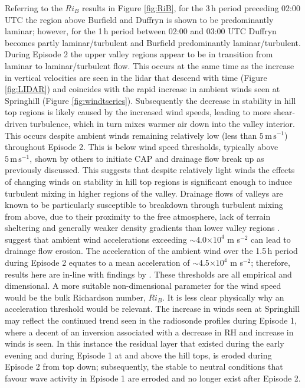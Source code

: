 \documentclass[times]{qjrms4}
\begin{document}
Referring to the $Ri_{B}$ results in Figure \ref{fig:RiB}, for the 3$\,\mbox{h}$ period preceding 02:00 UTC the region above Burfield and Duffryn is shown to be predominantly laminar; however, for the 1$\,\mbox{h}$ period between 02:00 and 03:00 UTC Duffryn becomes partly laminar/turbulent and Burfield predominantly laminar/turbulent. During Episode 2 the upper valley regions appear to be in transition from laminar to laminar/turbulent flow. This occurs at the same time as the increase in vertical velocities are seen in the lidar that descend with time (Figure \ref{fig:LIDAR}) and coincides with the rapid increase in ambient winds seen at Springhill (Figure \ref{fig:windtseries}). Subsequently the decrease in stability in hill top regions is likely caused by the increased wind speeds, leading to more shear-driven turbulence, which in turn mixes warmer air down into the valley interior. This occurs despite ambient winds remaining relatively low (less than $5\,\mbox{m}\,\mbox{s}^{-1}$) throughout Episode 2. This is below wind speed thresholds, typically above $5\,\mbox{m}\,\mbox{s}^{-1}$, shown by others to initiate CAP and drainage flow break up as previously discussed. This suggests that despite relatively light winds the effects of changing winds on stability in hill top regions is significant enough to induce turbulent mixing in higher regions of the valley. Drainage flows  of valleys are known to be particularly susceptible to breakdown through turbulent mixing from above, due to their proximity to the free atmosphere, lack of terrain sheltering and generally weaker density gradients than lower valley regions \citep{barr1989influence,gudiksen1992measurements}. \citet{orgill1992mesoscale} suggest that ambient wind accelerations exceeding $\sim$4.0$\times10^4$ m s$^{-2}$ can lead to drainage flow erosion. The acceleration of the ambient wind over the 1.5$\,\mbox{h}$ period during Episode 2 equates to a mean acceleration of $\sim$4.5$\times10^4$ m s$^{-2}$; therefore, results here are in-line with findings by \citet{orgill1992mesoscale}. These thresholds are all empirical and dimensional. A more suitable non-dimensional parameter for the wind speed would be the bulk Richardson number, $Ri_B$. It is less clear physically why an acceleration threshold would be relevant. The increase in winds seen at Springhill may reflect the continued trend seen in the radiosonde profiles during Episode 1, where a decent of an inversion associated with a decrease in RH and increase in winds is seen. In this instance the residual layer that existed during the early evening and during Episode 1 at and above the hill tops, is eroded during Episode 2 from top down; subsequently, the stable to neutral conditions that favour wave activity in Episode 1 are erroded and no longer exist after Episode 2.
\end{document}
